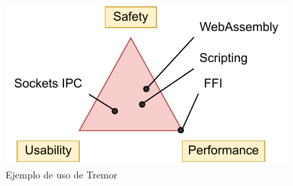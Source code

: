 \begin{figure}
    \centering
    \includegraphics[width=\textwidth]{./Imagenes/triangle.pdf}
    \caption{Ejemplo de uso de Tremor}%
    \label{fig:tech_triangle}
\end{figure}
